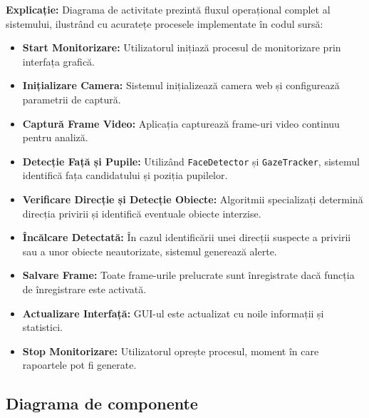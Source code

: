 \documentclass[12pt,a4paper]{article}
\begin{document}
\textbf{Explicație:} Diagrama de activitate prezintă fluxul operațional complet al sistemului, ilustrând cu acuratețe procesele implementate în codul sursă:
\begin{itemize}
    \item \textbf{Start Monitorizare:} Utilizatorul inițiază procesul de monitorizare prin interfața grafică.
    \item \textbf{Inițializare Camera:} Sistemul inițializează camera web și configurează parametrii de captură.
    \item \textbf{Captură Frame Video:} Aplicația capturează frame-uri video continuu pentru analiză.
    \item \textbf{Detecție Față și Pupile:} Utilizând \texttt{FaceDetector} și \texttt{GazeTracker}, sistemul identifică fața candidatului și poziția pupilelor.
    \item \textbf{Verificare Direcție și Detecție Obiecte:} Algoritmii specializați determină direcția privirii și identifică eventuale obiecte interzise.
    \item \textbf{Încălcare Detectată:} În cazul identificării unei direcții suspecte a privirii sau a unor obiecte neautorizate, sistemul generează alerte.
    \item \textbf{Salvare Frame:} Toate frame-urile prelucrate sunt înregistrate dacă funcția de înregistrare este activată.
    \item \textbf{Actualizare Interfață:} GUI-ul este actualizat cu noile informații și statistici.
    \item \textbf{Stop Monitorizare:} Utilizatorul oprește procesul, moment în care rapoartele pot fi generate.
\end{itemize}

\subsection{Diagrama de componente}
\end{document}
